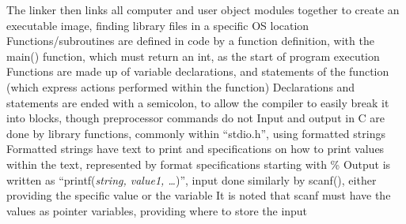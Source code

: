 \documentclass[11 pt, twoside]{article}
\newenvironment{outline*}
{
	\begin{outline}[enumerate]
	}
	{\end{outline}
}
\begin{document}
\begin{outline*}
\2 The linker then links all computer and user object modules together to create an executable image, finding library files in a specific OS location
\1 Functions/subroutines are defined in code by a function definition, with the main() function, which must return an int, as the start of program execution
\2 Functions are made up of variable declarations, and statements of the function (which express actions performed within the function)
\2 Declarations and statements are ended with a semicolon, to allow the compiler to easily break it into blocks, though preprocessor commands do not
\1 Input and output in C are done by library functions, commonly within ``stdio.h'', using formatted strings
\2 Formatted strings have text to print and specifications on how to print values within the text, represented by format specifications starting with \%
\2 Output is written as ``printf(\textit{string, value1, \dots})'', input done similarly by scanf(), either providing the specific value or the variable
\3 It is noted that scanf must have the values as pointer variables, providing where to store the input
\end{outline*}
\end{document}
